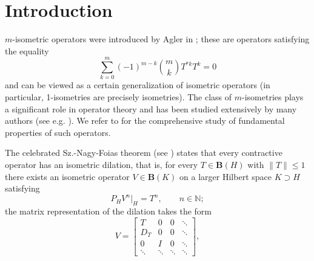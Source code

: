 \documentclass{amsart}
\renewcommand{\le}{\leqslant}
\theoremstyle{definition}
\numberwithin{equation}{section}
\begin{document}
\section{Introduction}
\label{SecIntroduction}
$ m $-isometric operators were introduced by Agler in \cite{aglerDisconjugacyTheoremToeplitz}; these are operators satisfying the equality
\begin{equation*}
    \sum_{k=0}^{m} (-1)^{m-k}\binom{m}{k}T^{\ast k}T^{k} = 0
\end{equation*}
and can be viewed as a certain generalization of isometric operators (in particular, 1-isometries are precisely isometries). The class of $ m $-isometries plays a significant role in operator theory and has been studied extensively by many authors (see e.g. \cite{bermudezLocalSpectralPropertiesOfMIsometric,bermudezProductsMisometries,jablonskiMisometricOperatorsTheirSpectralProperties,anandSolutionToCauchyDualSubnormalityProblem,RichterRepresentationCyclic2Isometries}). We refer to \cite{aglerMIsometricTransformationsOfHilbertSpaceI,aglerMIsometricTransformationsOfHilbertSpaceII,aglerMIsometricTransformationsOfHilbertSpaceIII} for the comprehensive study of fundamental properties of such operators. \par
The celebrated Sz.-Nagy-Foias theorem (see \cite[Chapter I, Theorem 4.1]{SzNagyHarmonicAnalysisOfOperators}) states that every contractive operator has an isometric dilation, that is, for every $ T\in \mathbf{B}(H) $ with $ \lVert T\rVert \le 1 $ there exists an isometric operator $ V\in \mathbf{B}(K) $ on a larger Hilbert space $ K\supset H $ satisfying
\begin{equation*}
    P_{H}V^{n}|_{H} = T^{n}, \qquad n\in \mathbb{N};
\end{equation*}
the matrix representation of the dilation takes the form
\begin{equation}
    \label{FormDilationSzNagy}
    V = \begin{bmatrix}
        T & 0 & 0 & \ddots\\
        D_{T} & 0 & 0 & \ddots\\
        0 & I & 0 & \ddots\\
        \ddots & \ddots & \ddots & \ddots
    \end{bmatrix},
\end{equation}
\end{document}
